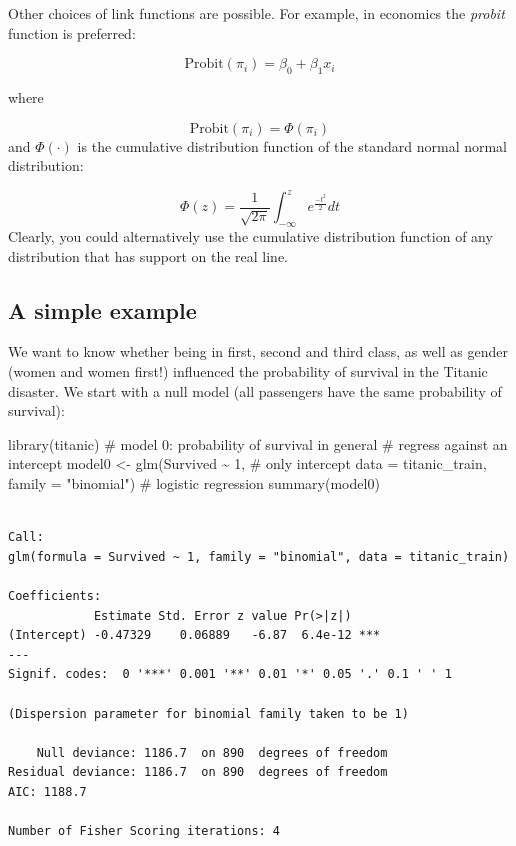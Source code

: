 \documentclass[
  letterpaper,
  DIV=11,
  numbers=noendperiod]{scrreprt}
\newenvironment{Shaded}{\begin{snugshade}}{\end{snugshade}}
\newcommand{\AttributeTok}[1]{\textcolor[rgb]{0.40,0.45,0.13}{#1}}
\newcommand{\CommentTok}[1]{\textcolor[rgb]{0.37,0.37,0.37}{#1}}
\newcommand{\DecValTok}[1]{\textcolor[rgb]{0.68,0.00,0.00}{#1}}
\newcommand{\FunctionTok}[1]{\textcolor[rgb]{0.28,0.35,0.67}{#1}}
\newcommand{\NormalTok}[1]{\textcolor[rgb]{0.00,0.23,0.31}{#1}}
\newcommand{\OtherTok}[1]{\textcolor[rgb]{0.00,0.23,0.31}{#1}}
\newcommand{\SpecialCharTok}[1]{\textcolor[rgb]{0.37,0.37,0.37}{#1}}
\newcommand{\StringTok}[1]{\textcolor[rgb]{0.13,0.47,0.30}{#1}}
\begin{document}
Other choices of link functions are possible. For example, in economics
the \emph{probit} function is preferred:

\[
\text{Probit}(\pi_i) = \beta_0 + \beta_1 x_i
\]

where

\[
\text{Probit}(\pi_i) = \Phi(\pi_i)
\] and \(\Phi(\cdot)\) is the cumulative distribution function of the
standard normal normal distribution:

\[
\Phi(z) = \frac{1}{\sqrt{2 \pi}}\int_{-\infty}^z e^{\frac{-t^2}{2}} dt
\] Clearly, you could alternatively use the cumulative distribution
function of any distribution that has support on the real line.

\hypertarget{a-simple-example}{%
\subsection{A simple example}\label{a-simple-example}}

We want to know whether being in first, second and third class, as well
as gender (women and women first!) influenced the probability of
survival in the Titanic disaster. We start with a null model (all
passengers have the same probability of survival):

\begin{Shaded}
\begin{Highlighting}[]
\FunctionTok{library}\NormalTok{(titanic)}
\CommentTok{\# model 0: probability of survival in general}
\CommentTok{\# regress against an intercept}
\NormalTok{model0 }\OtherTok{\textless{}{-}} \FunctionTok{glm}\NormalTok{(Survived }\SpecialCharTok{\textasciitilde{}} \DecValTok{1}\NormalTok{, }\CommentTok{\# only intercept}
              \AttributeTok{data =}\NormalTok{ titanic\_train, }
              \AttributeTok{family =} \StringTok{"binomial"}\NormalTok{) }\CommentTok{\# logistic regression}
\FunctionTok{summary}\NormalTok{(model0)}
\end{Highlighting}
\end{Shaded}

\begin{verbatim}

Call:
glm(formula = Survived ~ 1, family = "binomial", data = titanic_train)

Coefficients:
            Estimate Std. Error z value Pr(>|z|)    
(Intercept) -0.47329    0.06889   -6.87  6.4e-12 ***
---
Signif. codes:  0 '***' 0.001 '**' 0.01 '*' 0.05 '.' 0.1 ' ' 1

(Dispersion parameter for binomial family taken to be 1)

    Null deviance: 1186.7  on 890  degrees of freedom
Residual deviance: 1186.7  on 890  degrees of freedom
AIC: 1188.7

Number of Fisher Scoring iterations: 4
\end{verbatim}
\end{document}
